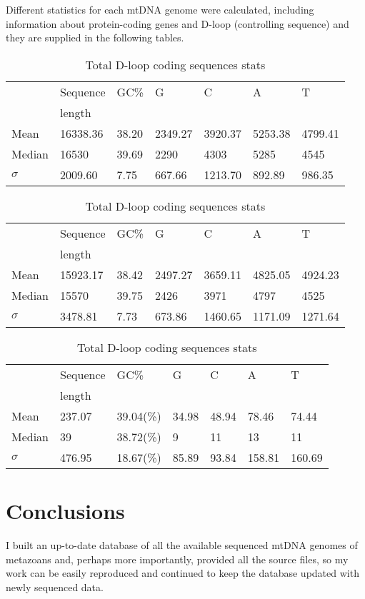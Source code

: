 \documentclass[a4paper,11pt]{article}
\begin{document}
Different statistics for each mtDNA genome were calculated, including information about protein-coding genes and D-loop (controlling sequence) and they are supplied in the following tables.

\begin{table}[H]
\caption{Total mtDNA genome statistics}
\begin{tabularx}{\textwidth}{|X|X|X|X|X|X|X|}
\hline
\small
 & Sequence & GC\% & G & C & A & T \\
 & length   &      &   &   &   & \\ \hline
Mean & 16338.36 & 38.20 & 2349.27 & 3920.37 & 5253.38 & 4799.41 \\ \hline
Median & 16530 & 39.69 & 2290 & 4303 & 5285 & 4545 \\ \hline
$\sigma$ & 2009.60 & 7.75 & 667.66 & 1213.70 & 892.89 & 986.35 \\ \hline
\end{tabularx}

\caption{Total gene-coding sequences statistics}
\begin{tabularx}{\textwidth}{|X|X|X|X|X|X|X|}
\hline
\small
 & Sequence & GC\% & G & C & A & T \\
 & length   &      &   &   &   & \\ \hline
Mean & 15923.17 & 38.42 & 2497.27 & 3659.11 & 4825.05 & 4924.23 \\ \hline
Median & 15570 & 39.75 & 2426 & 3971 & 4797 & 4525 \\ \hline
$\sigma$ & 3478.81 & 7.73 & 673.86 & 1460.65 & 1171.09 & 1271.64 \\ \hline
\end{tabularx}

\caption{Total D-loop coding sequences stats}
\begin{tabularx}{\textwidth}{|X|X|X|X|X|X|X|}
\hline
\small
 & Sequence & GC\% & G & C & A & T \\
 & length   &      &   &   &   & \\ \hline
Mean & 237.07 & 39.04(\%) & 34.98 & 48.94 & 78.46 & 74.44\\ \hline
Median & 39 & 38.72(\%) & 9 & 11 & 13 & 11\\ \hline
$\sigma$ & 476.95 & 18.67(\%) & 85.89 & 93.84 & 158.81 & 160.69\\ \hline
\end{tabularx}
\end{table}



\clearpage
\section{Conclusions}
I built an up-to-date database of all the available sequenced mtDNA genomes of metazoans and, perhaps more importantly, provided all the source files, so my work can be easily reproduced and continued to keep the database updated with newly sequenced data.
\end{document}
